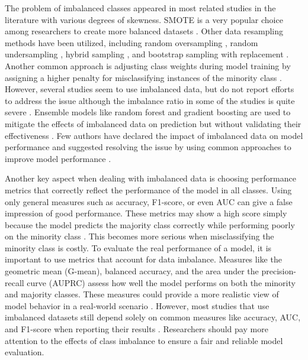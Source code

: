 The problem of imbalanced classes appeared in most related studies in the literature with various degrees of skewness. SMOTE is a very popular choice among researchers to create more balanced datasets \cite{Bucholc2023Hybrid, Ren2023Improving, Ren2025Identifying}. Other data resampling methods have been utilized, including random oversampling \cite{Twait2023Dementia}, random undersampling \cite{Ben2020Predicting}, hybrid sampling \cite{Sharma2024Leveraging}, and bootstrap sampling with replacement \cite{Park2020Machine}. Another common approach is adjusting class weights during model training by assigning a higher penalty for misclassifying instances of the minority class \cite{Maito2022Classification, Oh2024Multivariable, Zhu2020Machine}. However, several studies seem to use imbalanced data, but do not report efforts to address the issue \cite{abbas2024Explainable, Nori2019Machine, Vyas2022Identifying, Wang2018Predictive} although the imbalance ratio in some of the studies is quite severe \cite{Akter2025Using, Li2023Machine}. Ensemble models like random forest and gradient boosting are used to mitigate the effects of imbalanced data on prediction but without validating their effectiveness \cite{Nori2019Machine, Wang2018Predictive}. Few authors have declared the impact of imbalanced data on model performance and suggested resolving the issue by using common approaches to improve model performance \cite{Davoudi2021Classifying}. 

Another key aspect when dealing with imbalanced data is choosing performance metrics that correctly reflect the performance of the model in all classes. Using only general measures such as accuracy, F1-score, or even AUC can give a false impression of good performance. These metrics may show a high score simply because the model predicts the majority class correctly while performing poorly on the minority class \cite{Pattaramon2021On}. This becomes more serious when misclassifying the minority class is costly. To evaluate the real performance of a model, it is important to use metrics that account for data imbalance. Measures like the geometric mean (\acrshort{G-mean}), balanced accuracy, and the area under the precision-recall curve (\acrshort{AUPRC}) assess how well the model performs on both the minority and majority classes. These measures could provide a more realistic view of model behavior in a real-world scenario \cite{Pattaramon2021On}. However, most studies that use imbalanced datasets still depend solely on common measures like accuracy, AUC, and F1-score when reporting their results \cite{abbas2024Explainable, Ben2020Predicting, Sharma2024Leveraging, Vyas2022Identifying}. Researchers should pay more attention to the effects of class imbalance to ensure a fair and reliable model evaluation.

